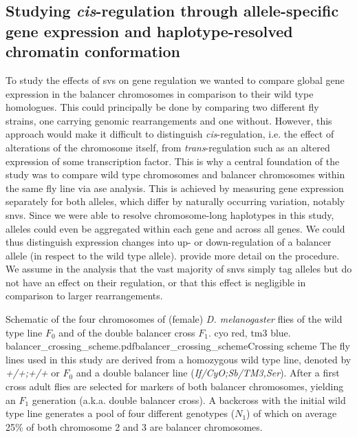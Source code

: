 \subsection{Studying \texorpdfstring{\textit{cis}}{cis}-regulation through
    allele-specific gene expression and haplotype-resolved chromatin conformation}
\label{sec:balancer_ase_motivation}

To study the effects of \acp{sv} on gene regulation we wanted to compare global
gene expression in the balancer chromosomes in comparison to their wild type
homologues. This could principally be done by comparing two different fly
strains, one carrying genomic rearrangements and one without. However, this
approach would make it difficult to distinguish \textit{cis}-regulation, i.e.
the effect of alterations of the chromosome itself, from
\textit{trans}-regulation such as an altered expression of some transcription
factor. This is why a central foundation of the study was to compare wild
type chromosomes and balancer chromosomes within the same fly line via \acf{ase} analysis.
This is achieved by measuring gene expression separately for both alleles, which
differ by naturally occurring variation, notably \acp{snv}. Since we were
able to resolve chromosome-long haplotypes in this study, alleles could even be
aggregated within each gene and across all genes. We could thus distinguish
expression changes into up- or down-regulation of a balancer allele (in respect
to the wild type allele). 
provide more detail on the procedure. We assume in the \ase analysis that the
vast majority of \acp{snv} simply tag alleles but do not have an effect on
their regulation, or that this effect is negligible in comparison
to larger rearrangements.

        {Schematic of the
        four chromosomes of (female) \textit{D. melanogaster} flies of the wild
        type line $F_0$ and of the double balancer cross $F_1$. \Ac{cyo} red,
        \ac{tm3} blue. }
    {balancer_crossing_scheme.pdf}{balancer_crossing_scheme}{Crossing scheme}{
        The fly lines used in this study are derived from a homozygous wild type
        line, denoted by \textit{+/+;+/+} or $F_0$ and a double balancer line
        (\textit{If/CyO;Sb/TM3,Ser}). After a first cross adult flies are
        selected for markers of both balancer chromosomes, yielding an $F_1$
        generation (a.k.a. double balancer cross). A backcross with the initial
        wild type line generates a pool of four different genotypes ($N_1$)
        of which on average 25\% of both chromosome 2 and 3 are balancer
        chromosomes.}


